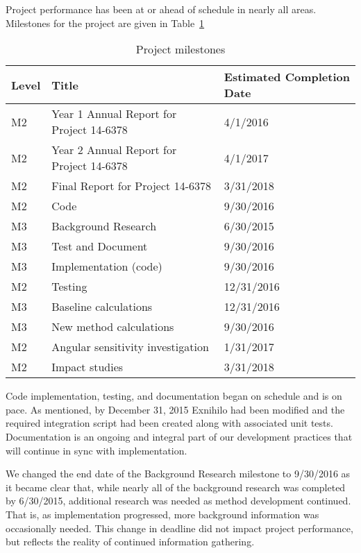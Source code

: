 \documentclass[12pt]{article}
\begin{document}
Project performance has been at or ahead of schedule in nearly all areas. 
Milestones for the project are given in Table~\ref{tab:milestones}
\begin{table}[h!]
\begin{center}
\caption{Project milestones}
\begin{tabular}{ | l | l | l | }
\hline
	\textbf{Level} & \textbf{Title} & \textbf{Estimated Completion Date} \\ \hline
	M2 & Year 1 Annual Report for Project 14-6378 & 4/1/2016 \\ \hline
	M2 & Year 2 Annual Report for Project 14-6378 & 4/1/2017 \\ \hline
	M2 & Final Report for Project 14-6378 & 3/31/2018 \\ \hline
	M2 & Code & 9/30/2016 \\ \hline
	M3 & \hspace*{1em} Background Research & 6/30/2015 \\ \hline
	M3 & \hspace*{1em} Test and Document & 9/30/2016 \\ \hline
	M3 & \hspace*{1em} Implementation (code) & 9/30/2016 \\ \hline	
	M2 & Testing & 12/31/2016 \\ \hline
	M3 & \hspace*{1em} Baseline calculations & 12/31/2016 \\ \hline
	M3 & \hspace*{1em} New method calculations & 9/30/2016 \\ \hline
	M2 & Angular sensitivity investigation & 1/31/2017 \\ \hline
	M2 & Impact studies & 3/31/2018 \\ \hline
\end{tabular}
\label{tab:milestones}
\end{center}
\end{table}

Code implementation, testing, and documentation began on schedule and is on pace. 
As mentioned, by December 31, 2015 Exnihilo had been modified and the required integration script had been created along with associated unit tests. 
Documentation is an ongoing and integral part of our development practices that will continue in sync with implementation. 

We changed the end date of the Background Research milestone to 9/30/2016 as it became clear that, while nearly all of the background research was completed by 6/30/2015, additional research was needed as method development continued.
That is, as implementation progressed, more background information was occasionally needed. 
This change in deadline did not impact project performance, but reflects the reality of continued information gathering.
\end{document}

